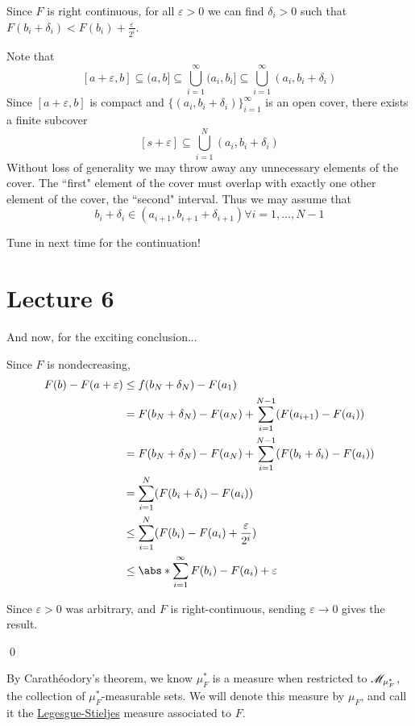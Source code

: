 \documentclass[x11names,reqno,14pt]{extarticle}
\newcommand*{\oo}{\infty}
\newcommand{\seq}[1]{_{#1 = 1}^\oo}
\begin{document}
Since $F$ is right continuous, for all $\varepsilon>0$ we can find $\delta_i>0$ such that $F(b_i + \delta_i) < F(b_i) + \frac{\varepsilon}{2^i}$. 

Note that 
\[
[a + \varepsilon, b]\subseteq(a, b] \subseteq \bigcup\seq{i}(a_i, b_i]\subseteq\bigcup\seq{i}(a_i, b_i+\delta_i)
\]
Since $[a +\varepsilon, b]$ is compact and $\{(a_i, b_i + \delta_i)\}\seq{i}$ is an open cover, there exists a finite subcover
\[
[s +\varepsilon] \subseteq\bigcup_{i=1}^N(a_i, b_i +\delta_i)
\]
Without loss of generality we may throw away any unnecessary elements of the cover. The ``first" element of the cover must overlap with exactly one other element of the cover, the ``second" interval. Thus we may assume that
\[
b_i + \delta_i\in(a_{i + 1}, b_{i + 1}+\delta_{i + 1})\forall i = 1, \dots, N - 1
\]

Tune in next time for the continuation!

\section*{Lecture 6} 

And now, for the exciting conclusion...

Since $F$ is nondecreasing, 
\begin{align*}
F(b) - F(a + \varepsilon) & \leq f(b_N + \delta_N) - F(a_1) \\
								   & = F(b_N + \delta_N) - F(a_N) + \sum_{i=1}^{N - 1}(F(a_{i + 1}) - F(a_i)) \\
									& = F(b_N + \delta_N) - F(a_N) + \sum_{i=1}^{N - 1} (F(b_i + \delta_i) - F(a_i)) \\
									& = \sum_{i=1}^N(F(b_i + \delta_i) - F(a_i)) \\
									& \leq \sum_{i=1}^N(F(b_i) - F(a_i) + \frac{\varepsilon}{2^i}) \\
									& \leq \abs*{\sum\seq{i}F(b_i) - F(a_i)} + \varepsilon \\
\end{align*}

Since $\varepsilon>0$ was arbitrary, and $F$ is right-continuous, sending $\varepsilon\to0$ gives the result. 

\qed


By Carath\'eodory's theorem, we know $\mu^*_F$ is a measure when restricted to $\mathscr{M}_{\mu^*_F}$, the collection of $\mu^*_F$-measurable sets. We will denote this measure by $\mu_F$, and call it the \underline{Legesgue-Stieljes} measure associated to $F$. 
\end{document}
